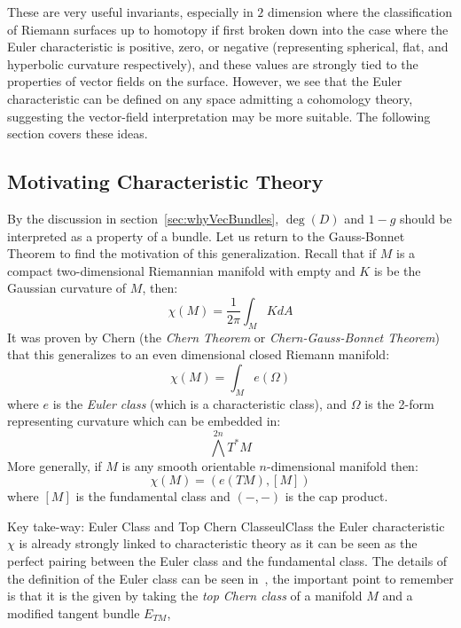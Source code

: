 \documentclass{book}
\newcommand{\qn}{\quad\newline}
\renewcommand{\deg}{{\operatorname{deg}}}
\begin{document}
These are very useful invariants, especially in $2$ dimension where the classification of Riemann surfaces up
to homotopy if first broken down into the case where the Euler characteristic is positive, zero, or negative
(representing spherical, flat, and hyperbolic curvature respectively), and these values are strongly tied to
the properties of vector fields on the surface. However, we see that the Euler characteristic can be defined
on any space admitting a cohomology theory, suggesting the vector-field interpretation may be more suitable. The
following section covers these ideas.


\subsection{Motivating Characteristic Theory}\label{sec:motivatingCharTheory}

By the discussion in section~\ref{sec:whyVecBundles}, $\deg(D)$ and $1-g$ should be interpreted as a property
of a bundle. Let us return to the Gauss-Bonnet Theorem to find the motivation of this generalization. Recall
that if $M$ is a compact two-dimensional Riemannian manifold with empty and $K$ is be the Gaussian curvature
of $M$, then:
\[
  \chi(M) = \frac{1}{2\pi }\int_M K dA
\]
It was proven by Chern (the \emph{Chern Theorem} or \emph{Chern-Gauss-Bonnet Theorem}) that this generalizes
to an even dimensional closed Riemann manifold:
\[
  \chi(M) = \int_M e(\Omega)
\]
where $e$ is the \emph{Euler class} (which is a characteristic class), and $\Omega$ is the 2-form representing
curvature which can be embedded in: \[
  \bigwedge^{2n} T^*M
\]
More generally, if $M$ is any smooth orientable $n$-dimensional manifold then:
\[
  \chi(M) = (e(TM), [M])
\]
where $[M]$ is the fundamental class and $(-,-)$ is the cap product.

\begin{titledBox}{Key take-way: Euler Class and Top Chern Class}{eulClass}
  \qn
  the Euler characteristic $\chi$ is already strongly linked to characteristic theory as it can be seen as the
  perfect pairing between the Euler class and the fundamental class. The details of the definition of the
  Euler class can be seen in~\cite{NateKTheory}, the important point to remember is that it is the given by
  taking the \emph{top Chern class} of a manifold $M$ and a modified tangent bundle $E_{TM}$,
\end{titledBox}
\end{document}
